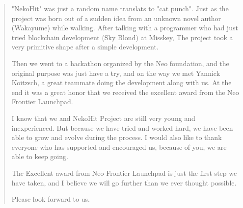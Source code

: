 \documentclass[12pt,a4paper]{article}
\begin{document}
    \begin{quotation}
        "NekoHit" was just a random name translats to "cat punch".
        Just as the project was born out of a sudden idea
        from an unknown novel author (Wakayume) while walking.
        After talking with a programmer who had just tried
        blockchain development (Sky Blond) at Misskey,
        The project took a very primitive shape after a simple development.

        Then we went to a hackathon organized by the Neo foundation,
        and the original purpose was just have a try, and on the way we
        met Yannick Koitzsch, a great teammate doing the development along
        with us. At the end it was a great honor that we received the excellent
        award from the Neo Frontier Launchpad.

        I know that we and NekoHit Project are still very young and inexperienced.
        But because we have tried and worked hard, we have been able to grow and
        evolve during the process. I would also like to thank everyone who has
        supported and encouraged us, because of you, we are able to keep going.

        The Excellent award from Neo Frontier Launchpad is just the first step
        we have taken, and I believe we will go further than we ever thought
        possible.

        Please look forward to us.

    \end{quotation}

    \clearpage

    
    
\end{document}
